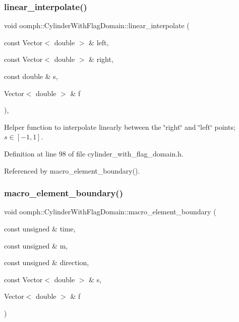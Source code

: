 \mbox{\label{classoomph_1_1CylinderWithFlagDomain_aa0f0db0fdf2b271a6dde42ef36e9d40d}} 
\subsubsection{\texorpdfstring{linear\+\_\+interpolate()}{linear\_interpolate()}}
{\footnotesize\ttfamily void oomph\+::\+Cylinder\+With\+Flag\+Domain\+::linear\+\_\+interpolate (\begin{DoxyParamCaption}\item[{const Vector$<$ double $>$ \&}]{left,  }\item[{const Vector$<$ double $>$ \&}]{right,  }\item[{const double \&}]{s,  }\item[{Vector$<$ double $>$ \&}]{f }\end{DoxyParamCaption})\hspace{0.3cm}{\ttfamily [inline]}, {\ttfamily [private]}}



Helper function to interpolate linearly between the \char`\"{}right\char`\"{} and \char`\"{}left\char`\"{} points; $ s \in [-1,1] $. 



Definition at line 98 of file cylinder\+\_\+with\+\_\+flag\+\_\+domain.\+h.



Referenced by macro\+\_\+element\+\_\+boundary().

\mbox{\label{classoomph_1_1CylinderWithFlagDomain_a40bca9a30f1f874c043e68621b28de74}} 
\subsubsection{\texorpdfstring{macro\+\_\+element\+\_\+boundary()}{macro\_element\_boundary()}}
{\footnotesize\ttfamily void oomph\+::\+Cylinder\+With\+Flag\+Domain\+::macro\+\_\+element\+\_\+boundary (\begin{DoxyParamCaption}\item[{const unsigned \&}]{time,  }\item[{const unsigned \&}]{m,  }\item[{const unsigned \&}]{direction,  }\item[{const Vector$<$ double $>$ \&}]{s,  }\item[{Vector$<$ double $>$ \&}]{f }\end{DoxyParamCaption})}



